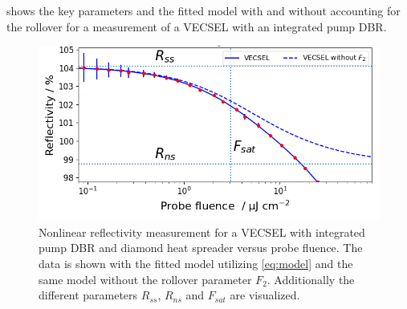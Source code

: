  shows the key parameters and the fitted model with and without accounting for the rollover for a measurement of a VECSEL with an integrated pump DBR.


\begin{figure}[ht]
    \centering
    \includegraphics[width=12cm]{images/gainSat.png}
    \caption{Nonlinear reflectivity measurement for a VECSEL with integrated pump DBR and diamond heat spreader versus probe fluence. The data is shown with the fitted model utilizing \cref{eq:model} and the same model without the rollover parameter $F_2$. Additionally the different parameters $R_{ss}$, $R_{ns}$ and $F_{sat}$ are visualized.}
    \label{fig:gainSat}
\end{figure}